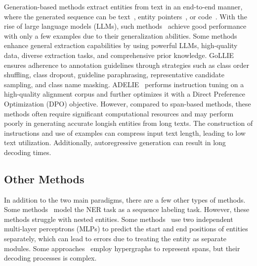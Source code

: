 Generation-based methods extract entities from text in an end-to-end manner, 
where the generated sequence can be 
text~\cite{lu2022unified,jiang2024toner}, entity pointers~\cite{yan2021unified}, or code~\cite{sainz2023gollie}. 
With the rise of large language models (LLMs), such methods~\cite{wang2023gpt,xie-etal-2023-empirical,ashok2023promptner} achieve good performance with only a few examples due to their generalization abilities. 
Some methods~\cite{wang2023instructuie,dagdelen2024structured} enhance general extraction capabilities by using powerful LLMs, high-quality data, diverse extraction tasks, and comprehensive prior knowledge. 
GoLLIE~\cite{sainz2023gollie} ensures adherence to annotation guidelines through strategies such as class order shuffling, class dropout, guideline paraphrasing, representative candidate sampling, and class name masking. 
ADELIE~\cite{qi2024adelie} performs instruction tuning
on a high-quality alignment corpus and further optimizes it with a Direct Preference Optimization (DPO) objective. 
However, compared to span-based methods,
these methods often require significant computational resources and may perform poorly in generating accurate longish entities from long texts.
The construction of instructions and use of examples can compress input text length, leading to low text utilization. Additionally, autoregressive generation can result in long decoding times. 

\subsection{Other Methods}

In addition to the two main paradigms, there are a few other types of methods. 
Some methods~\cite{ma2016end,yan2019tener,strakova2019neural} model the NER task as a sequence labeling task. 
However, these methods struggle with nested entities. 
Some methods~\cite{li2019unified,tan2021sequence,shen2022parallel} use two independent multi-layer perceptrons (MLPs) to predict the start and end positions of entities separately, which can lead to errors due to treating the entity as separate modules. 
Some approaches~\cite{lou-etal-2022-nested,yang-tu-2022-bottom} employ hypergraphs to represent spans, but their decoding processes is complex.

